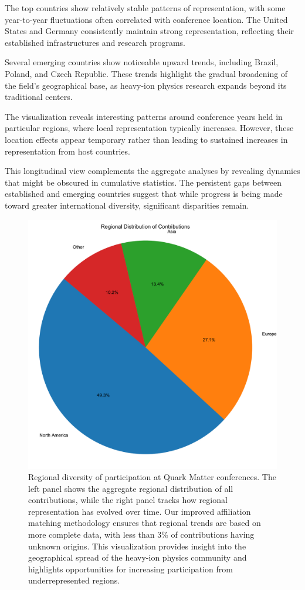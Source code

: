 \documentclass[a4paper,11pt]{article}
\begin{document}
The top countries show relatively stable patterns of representation, with some year-to-year fluctuations often correlated with conference location. The United States and Germany consistently maintain strong representation, reflecting their established infrastructures and research programs.

Several emerging countries show noticeable upward trends, including Brazil, Poland, and Czech Republic. These trends highlight the gradual broadening of the field's geographical base, as heavy-ion physics research expands beyond its traditional centers.

The visualization reveals interesting patterns around conference years held in particular regions, where local representation typically increases. However, these location effects appear temporary rather than leading to sustained increases in representation from host countries.

This longitudinal view complements the aggregate analyses by revealing dynamics that might be obscured in cumulative statistics. The persistent gaps between established and emerging countries suggest that while progress is being made toward greater international diversity, significant disparities remain.

\begin{figure}[H]
\centering
\includegraphics[width=\textwidth]{figures/regional_diversity.pdf}
\caption{Regional diversity of participation at Quark Matter conferences. The left panel shows the aggregate regional distribution of all contributions, while the right panel tracks how regional representation has evolved over time. Our improved affiliation matching methodology ensures that regional trends are based on more complete data, with less than 3\% of contributions having unknown origins. This visualization provides insight into the geographical spread of the heavy-ion physics community and highlights opportunities for increasing participation from underrepresented regions.}
\label{fig:regional_diversity}
\end{figure}
\end{document}

